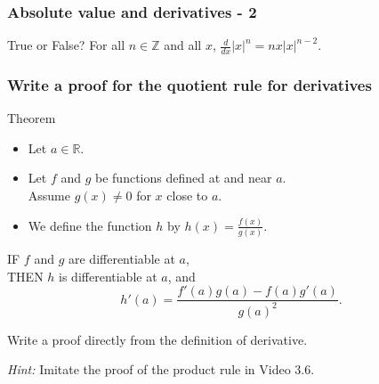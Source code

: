 \documentclass[14pt]{beamer}
\newcommand {\DS} [1] {${\displaystyle #1}$}
\newcommand {\R}{\mathbb{R}}
\newcommand {\Z}{\mathbb{Z}}
\newcommand{\setsize}[1]{\fontsize{#1}{#1}\selectfont} %
\newcommand{\smallerfont}{\setsize{13}} %
\begin{document}
\begin{frame}[t]
\frametitle{Absolute value and derivatives - 2}

\begin{block}{True or False?}
For all $n \in \Z$ and all $x$, $\frac{d}{dx}|x|^n=nx|x|^{n-2}$.

\end{block}
\end{frame}


\begin{frame}[t]
\smallerfont
\frametitle{Write a proof for the quotient rule for derivatives}

\begin{block}{Theorem}
\begin{itemize}
	\item Let $a \in \R$.
	\item  Let $f$ and $g$ be functions defined at and near $a$. \\
		Assume $g(x) \neq 0$ for $x$ close to $a$.
	\item  We define the function $h$ by  \DS{h(x) = \frac{f(x)}{g(x)}}.
\end{itemize}

IF $f$ and $g$ are differentiable at $a$, \\
THEN  $h$ is differentiable at $a$, and
	$$
		h'(a) =  \frac{f'(a) g(a) - f(a) g'(a)}{g(a)^2}.
	$$
\end{block}

\vfill


Write a proof directly from the definition of derivative.

\emph{Hint:} Imitate the proof of the product rule in  Video 3.6.

\end{frame}
\end{document}
